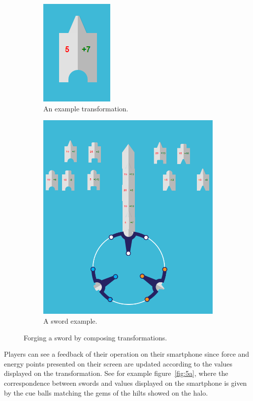 \begin{figure}[ht!] 
  \begin{subfigure}[t]{0.48\linewidth}
    \centering
    \includegraphics[width=0.35\linewidth]{images/c5/transformation.png} 
    \caption{An example transformation.}\label{fig:4a}
  \end{subfigure}\hfill
  \begin{subfigure}[t]{0.48\linewidth}
    \centering
    \includegraphics[width=0.60\linewidth]{images/c5/sword-example.png} 
    \caption{A sword example.}\label{fig:4b}
  \end{subfigure}
  \caption{Forging a sword by composing transformations.}
\end{figure}

Players can see a feedback of their operation on their smartphone since force and energy points presented on their screen are updated according to the values displayed on the transformation. See for example figure~\ref{fig:5a}, where the correspondence between swords and values displayed on the smartphone is given by the cue balls matching the gems of the hilts showed on the halo.

